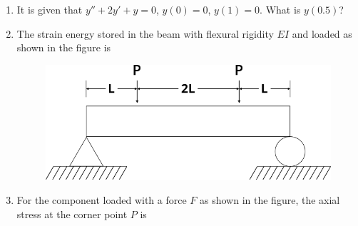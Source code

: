 \documentclass[journal,12pt,onecolumn]{IEEEtran}
\begin{document}
\begin{enumerate}
    \item It is given that $y'' + 2y' + y=0$, $y(0)=0$, $y(1)=0$. What is $y(0.5)$?\\

          \begin{enumerate}
          \end{enumerate}

    \item The strain energy stored in the beam with flexural rigidity $EI$ and loaded as shown in the figure is\\

          \begin{figure}[H]
              \centering
              \includegraphics[scale=0.5]{q30}
              \caption{}
              \label{q30}
          \end{figure}

          \begin{enumerate}
          \end{enumerate}

    \item For the component loaded with a force $F$ as shown in the figure, the axial stress at the corner point $P$ is\\


\end{enumerate}
\end{document}
